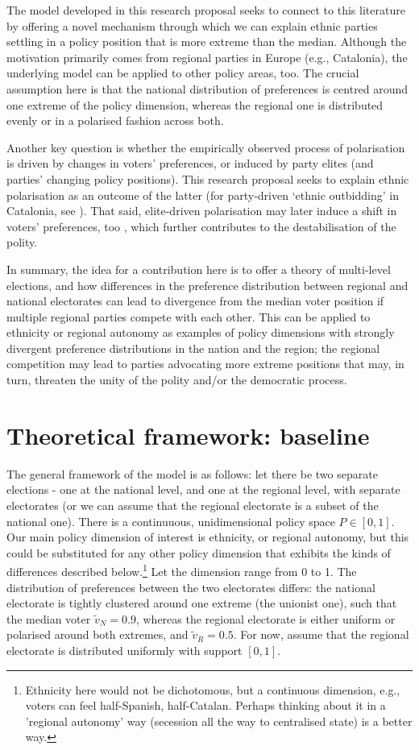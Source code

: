 \documentclass[11pt]{article}
\begin{document}
The model developed in this research proposal seeks to connect to this literature by offering a novel mechanism through which we can explain ethnic parties settling in a policy position that is more extreme than the median. Although the motivation primarily comes from regional parties in Europe (e.g., Catalonia), the underlying model can be applied to other policy areas, too. The crucial assumption here is that the national distribution of preferences is centred around one extreme of the policy dimension, whereas the regional one is distributed evenly or in a polarised fashion across both.

Another key question is whether the empirically observed process of polarisation is driven by changes in voters' preferences, or induced by party elites (and parties' changing policy positions). This research proposal seeks to explain ethnic polarisation as an outcome of the latter (for party-driven `ethnic outbidding' in Catalonia, see \textcite{Barrio2017}). That said, elite-driven polarisation may later induce a shift in voters' preferences, too \parencite[p. 291]{Horowitz2000}, which further contributes to the destabilisation of the polity.

In summary, the idea for a contribution here is to offer a theory of multi-level elections, and how differences in the preference distribution between regional and national electorates can lead to divergence from the median voter position if multiple regional parties compete with each other. This can be applied to ethnicity or regional autonomy as examples of policy dimensions with strongly divergent preference distributions in the nation and the region; the regional competition may lead to parties advocating more extreme positions that may, in turn, threaten the unity of the polity and/or the democratic process.

\section{Theoretical framework: baseline}

The general framework of the model is as follows: let there be two separate elections - one at the national level, and one at the regional level, with separate electorates (or we can assume that the regional electorate is a subset of the national one). There is a continuuous, unidimensional policy space $P \in [0, 1]$. Our main policy dimension of interest is ethnicity, or regional autonomy, but this could be substituted for any other policy dimension that exhibits the kinds of differences described below.\footnote{Ethnicity here would not be dichotomous, but a continuous dimension, e.g., voters can feel half-Spanish, half-Catalan. Perhaps thinking about it in a 'regional autonomy' way (secession all the way to centralised state) is a better way.} Let the dimension range from 0 to 1. The distribution of preferences between the two electorates differs: the national electorate is tightly clustered around one extreme (the unionist one), such that the median voter $\tilde{v}_N = 0.9$, whereas the regional electorate is either uniform or polarised around both extremes, and $\tilde{v}_R = 0.5$. For now, assume that the regional electorate is distributed uniformly with support $[0, 1]$.
\end{document}
